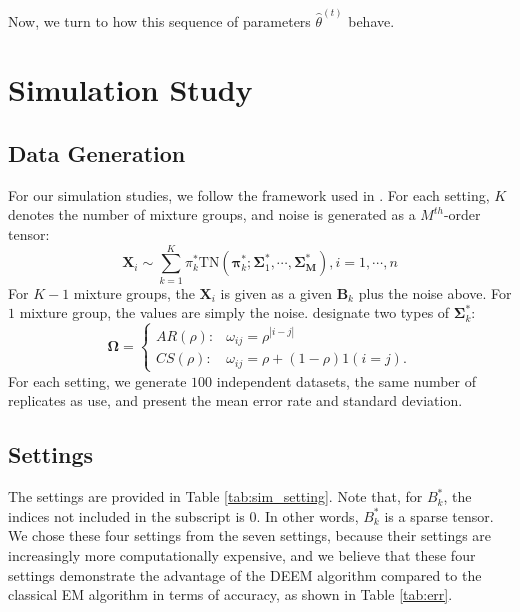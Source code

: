 \documentclass[11pt]{article}
\newcommand{\wh}{\widehat}
\begin{document}
Now, we turn to how this sequence of parameters $\wh\theta^{(t)}$ behave.





\section{Simulation Study}

\subsection{Data Generation}

For our simulation studies, we follow the framework used in \cite{mai2022DEEM}. For each setting, $K$ denotes the number of mixture groups, and noise is generated as a $M^{th}$-order tensor:  
\begin{equation}
    \mathbf{X}_i \sim \sum_{k=1}^K \pi^*_k \mbox{TN} (\boldsymbol{\pi}^*_k; \boldsymbol{\Sigma}^*_1, \cdots, \boldsymbol{\Sigma^*_M}), i = 1, \cdots, n
\end{equation}
For $K-1$ mixture groups, the $\mathbf{X}_i$ is given as a given $\mathbf{B}_k$ plus the noise above. For $1$ mixture group, the values are simply the noise. \cite{mai2022DEEM} designate two types of $\boldsymbol{\Sigma}^*_k$: 
\[  \boldsymbol{\Omega} =   \begin{cases}
     AR(\rho): & \omega_{ij} = \rho^{|i-j|} \\
    CS(\rho): & \omega_{ij} = \rho + (1-\rho) 1(i=j).
\end{cases}\]
For each setting, we generate $100$ independent datasets, the same number of replicates as \cite{mai2022DEEM} use, and present the mean error rate and standard deviation. 

\subsection{Settings}

The settings are provided in Table \ref{tab:sim_setting}. Note that, for ${B}^*_{k}$, the indices not included in the subscript is $0$. In other words, ${B}^*_k$ is a sparse tensor. We chose these four settings from the seven settings, because their settings are increasingly more computationally expensive, and we believe that these four settings demonstrate the advantage of the DEEM algorithm compared to the classical EM algorithm in terms of accuracy, as shown in Table \ref{tab:err}. 
\end{document}
